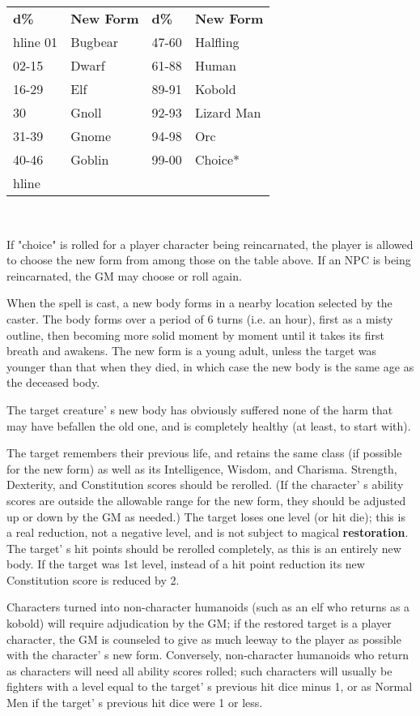 \documentclass[a4paper,twoside,openany,10pt]{book}
\begin{document}
\begin{multicols}{2}
\begin{tabular}[]{@{}ll|ll@{}}
\textbf{d\%} & \textbf{New Form}&\textbf{d\%} & \textbf{New Form}\\hline
01 & Bugbear &47-60 & Halfling\\\hline
02-15 & Dwarf &61-88 & Human\\\hline
16-29 & Elf &89-91 & Kobold\\\hline
30 & Gnoll &92-93 & Lizard Man\\\hline
31-39 & Gnome &94-98 & Orc \\\hline
40-46 & Goblin &99-00 & Choice*\\hline
\end{tabular}\\

\medskip

If "choice" is rolled for a player character being reincarnated, the player is allowed to choose the new form from among those on the table above. If an NPC is being reincarnated, the GM may choose or roll again.

When the spell is cast, a new body forms in a nearby location selected by the caster. The body forms over a period of 6 turns (i.e. an hour), first as a misty outline, then becoming more solid moment by moment until it takes its first breath and awakens. The new form is a young adult, unless the target was younger than that when they died, in which case the new body is the same age as the deceased body.

The target creature' s new body has obviously suffered none of the harm that may have befallen the old one, and is completely healthy (at least, to start with).

The target remembers their previous life, and retains the same class (if possible for the new form) as well as its Intelligence, Wisdom, and Charisma. Strength, Dexterity, and Constitution scores should be rerolled. (If the character' s ability scores are outside the allowable range for the new form, they should be adjusted up or down by the GM as needed.) The target loses one level (or hit die); this is a real reduction, not a negative level, and is not subject to magical \textbf{restoration}. The target' s hit points should be rerolled completely, as this is an entirely new body. If the target was 1st level, instead of a hit point reduction its new Constitution score is reduced by 2.

Characters turned into non-character humanoids (such as an elf who returns as a kobold) will require adjudication by the GM; if the restored target is a player character, the GM is counseled to give as much leeway to the player as possible with the character' s new form. Conversely, non-character humanoids who return as characters will need all ability scores rolled; such characters will usually be fighters with a level equal to the target' s previous hit dice minus 1, or as Normal Men if the target' s previous hit dice were 1 or less.


\end{multicols}
\end{document}
